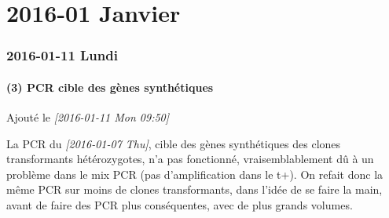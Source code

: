 \documentclass[9pt, oneside, twocolumn]{scrartcl}
\author{Samuel BARRETO}
\date{\today}
\title{}
\begin{document}
\tableofcontents


\part{2016-01 Janvier}
\label{sec:orgheadline47}
\section{2016-01-11 Lundi}
\label{sec:orgheadline6}
\subsection{(3) PCR cible des gènes synthétiques}
\label{sec:orgheadline4}
Ajouté le \textit{[2016-01-11 Mon 09:50]}

La PCR du \textit{[2016-01-07 Thu]}, cible des gènes synthétiques des clones
transformants hétérozygotes, n'a pas fonctionné, vraisemblablement dû à un
problème dans le mix PCR (pas d'amplification dans le t+). On refait donc la
même PCR sur moins de clones transformants, dans l'idée de se faire la main,
avant de faire des PCR plus conséquentes, avec de plus grands volumes. 
\end{document}
